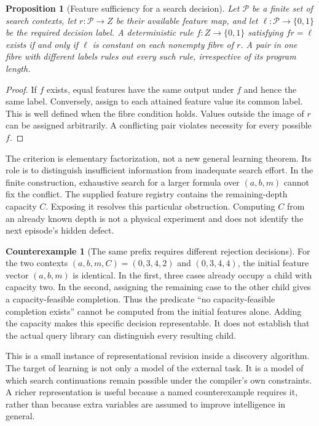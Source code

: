\documentclass[11pt,letterpaper]{article}
\theoremstyle{plain}
\newtheorem{proposition}[theorem]{Proposition}
\theoremstyle{definition}
\newtheorem{counterexample}[theorem]{Counterexample}
\begin{document}
\begin{proposition}[Feature sufficiency for a search decision]\label{prop:search-feature}
Let $\mathcal P$ be a finite set of search contexts, let $r:\mathcal P\to Z$ be their available feature map, and let $\ell:\mathcal P\to\{0,1\}$ be the required decision label. A deterministic rule $f:Z\to\{0,1\}$ satisfying $fr=\ell$ exists if and only if $\ell$ is constant on each nonempty fibre of $r$. A pair in one fibre with different labels rules out every such rule, irrespective of its program length.
\end{proposition}
\begin{proof}
If $f$ exists, equal features have the same output under $f$ and hence the same label. Conversely, assign to each attained feature value its common label. This is well defined when the fibre condition holds. Values outside the image of $r$ can be assigned arbitrarily. A conflicting pair violates necessity for every possible $f$.
\end{proof}

The criterion is elementary factorization, not a new general learning theorem. Its role is to distinguish insufficient information from inadequate search effort. In the finite construction, exhaustive search for a larger formula over $(a,b,m)$ cannot fix the conflict. The supplied feature registry contains the remaining-depth capacity $C$. Exposing it resolves this particular obstruction. Computing $C$ from an already known depth is not a physical experiment and does not identify the next episode's hidden defect.

\begin{counterexample}[The same prefix requires different rejection decisions]\label{ex:missing-capacity}
For the two contexts $(a,b,m,C)=(0,3,4,2)$ and $(0,3,4,4)$, the initial feature vector $(a,b,m)$ is identical. In the first, three cases already occupy a child with capacity two. In the second, assigning the remaining case to the other child gives a capacity-feasible completion. Thus the predicate ``no capacity-feasible completion exists'' cannot be computed from the initial features alone. Adding the capacity makes this specific decision representable. It does not establish that the actual query library can distinguish every resulting child.
\end{counterexample}

This is a small instance of representational revision inside a discovery algorithm. The target of learning is not only a model of the external task. It is a model of which search continuations remain possible under the compiler's own constraints. A richer representation is useful because a named counterexample requires it, rather than because extra variables are assumed to improve intelligence in general.
\end{document}
